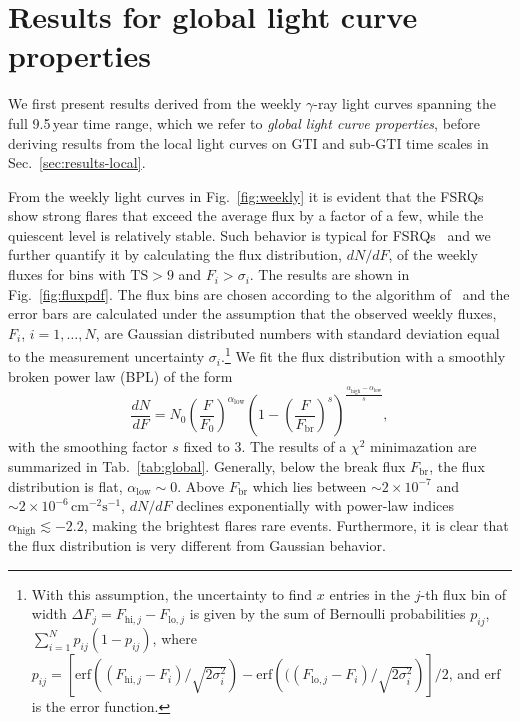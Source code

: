 \documentclass[twocolumn,linenumbers]{aastex62}
\newcommand{\gray}{$\gamma$-ray\xspace}
\begin{document}
\section{Results for global light curve properties}
\label{sec:results-global}
We first present results derived from the weekly \gray light curves spanning the full 9.5\,year time range, which we refer to \emph{global light curve properties}, before deriving results from the local light curves on GTI and sub-GTI time scales in Sec.~\ref{sec:results-local}.

From the weekly light curves in Fig.~\ref{fig:weekly} it is evident that the FSRQs show strong flares that exceed the average flux by a factor of a few, while the quiescent level is relatively stable. 
Such behavior is typical for FSRQs~\citet{} and we 
further quantify it by calculating the flux distribution, $dN/dF$, of the weekly fluxes for bins with $\mathrm{TS} > 9$ and $F_i > \sigma_i$. 
The results are shown in Fig.~\ref{fig:fluxpdf}. The flux bins are chosen according to the algorithm of~\citet{knuth2006} and the error bars are calculated under the assumption that the observed weekly fluxes, $F_i$, $i = 1,\ldots,N$, are Gaussian distributed numbers with standard deviation equal to the measurement uncertainty $\sigma_i$.\footnote{
With this assumption, the uncertainty to find $x$ entries in the $j$-th flux bin of width $\Delta F_j = F_{\mathrm{hi},j} - F_{\mathrm{lo},j}$ is given by the sum of Bernoulli probabilities $p_{ij}$, $\sum_{i = 1}^N p_{ij}(1-p_{ij})$, where $p_{ij} =  \left[\mathrm{erf}\left((F_{\mathrm{hi},j} - F_i) / \sqrt{2\sigma_i^2}\right) - \mathrm{erf}\left(((F_{\mathrm{lo},j} - F_i) / \sqrt{2\sigma_i^2}\right)\right]/2$, and $\mathrm{erf}$ is the error function.
}
We fit the flux distribution with a smoothly broken power law (BPL) of the form 
\begin{equation}
    \frac{dN}{dF} = N_0 \left( \frac{F}{F_0}\right)^{\alpha_\mathrm{low}}
        \left( 1 - \left(\frac{F}{F_\mathrm{br}}\right)^s \right)^{\frac{\alpha_\mathrm{high} - \alpha_\mathrm{low}}{s}},
        \label{eq:dndf}
\end{equation}
with the smoothing factor $s$ fixed to 3. 
The results of a $\chi^2$ minimazation are summarized in Tab.~\ref{tab:global}.
Generally, below the break flux $F_\mathrm{br}$, the flux distribution is flat, $\alpha_\mathrm{low}\sim 0$.
Above $F_\mathrm{br}$ which lies between $\sim2\times10^{-7}$ and $\sim2\times10^{-6}\,\mathrm{cm}^{-2}\mathrm{s}^{-1}$, $dN/dF$ declines exponentially with power-law indices $\alpha_\mathrm{high} \lesssim -2.2$, making the brightest flares rare events.
Furthermore, it is clear that the flux distribution is very different from Gaussian behavior. 
\end{document}
